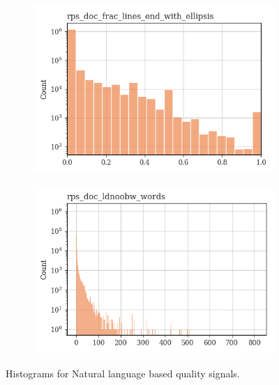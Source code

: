 \documentclass{article}
\begin{document}
\begin{figure}
\begin{subfigure}[b]{0.32\textwidth}
    \end{subfigure}
    \begin{subfigure}[b]{0.32\textwidth}
        \centering
        \includegraphics[width=\textwidth]{figures/quality_signals/rps_doc_frac_lines_end_with_ellipsis.png}
    \end{subfigure}
    \begin{subfigure}[b]{0.32\textwidth}
        \centering
        \includegraphics[width=\textwidth]{figures/quality_signals/rps_doc_ldnoobw_words.png}
    \end{subfigure}
    \caption{Histograms for Natural language based quality signals.}
    \label{fig:natlang-qs-dist}
\end{figure}
\end{document}
